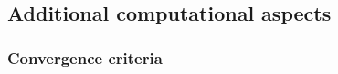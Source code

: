           \subsection{Additional computational aspects}
          \label{sec:addit-comp-aspects}



          \subsubsection{Convergence criteria}

